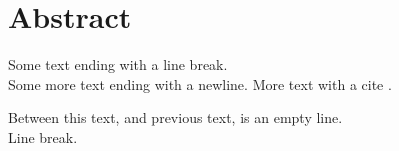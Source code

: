 \section{Abstract}
Some text ending with a line break.\\
Some more text ending with a newline.
\newline
More text with a cite \cite[p.~38]{OOAD}.

Between this text, and previous text, is an empty line.\\
Line break.
\newpage